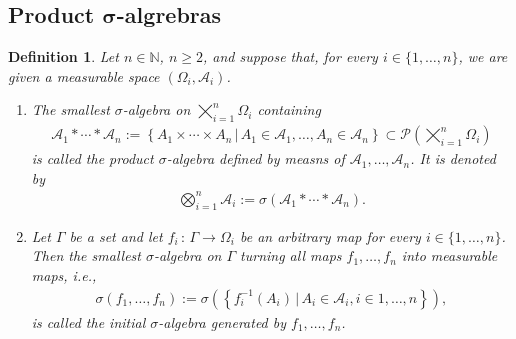 \documentclass{article}
\newtheorem{definition}{Definition}[section]
\numberwithin{equation}{section}
\begin{document}
\subsection{Product $\boldsymbol{\sigma}$-algrebras}
\begin{definition}
    Let $n\in\mathbb{N}$, $n \geq 2$, and suppose that, for every $i \in \{1,\ldots,n\}$, we are given a measurable space $(\Omega_i, \mathcal{A}_i)$.
    \begin{enumerate}
        \item The smallest $\sigma$-algebra on $\bigtimes_{i=1}^n \Omega_i$ containing
        \begin{align*}
            \mathcal{A}_1 \ast \cdots \ast \mathcal{A}_n := 
            \left\{A_1 \times \cdots \times A_n \, | \, A_1 \in \mathcal{A}_1, \ldots, A_n \in \mathcal{A}_n\right\} %
            \subset \mathcal{P}\left(\bigtimes_{i=1}^n \Omega_i\right)
        \end{align*}
        is called the product $\sigma$-algebra defined by measns of $\mathcal{A}_1,\ldots,\mathcal{A}_n$.
        It is denoted by
        \begin{align*}
            \bigotimes_{i=1}^n \mathcal{A}_i := \sigma\left(\mathcal{A}_1 \ast \cdots \ast \mathcal{A}_n\right).
        \end{align*}
        \item Let $\Gamma$ be a set and let $f_i \, : \, \Gamma \rightarrow \Omega_i$ be an arbitrary map for every $i \in \{1, \ldots, n\}$.
        Then the smallest $\sigma$-algebra on $\Gamma$ turning all maps $f_1,\ldots,f_n$ into measurable maps, i.e.,
        \begin{align*}
            \sigma(f_1, \ldots, f_n) := \sigma\left(\left\{f_i^{-1}(A_i)\, | \, A_i \in \mathcal{A}_i, i \in {1,\ldots,n}\right\}\right),
        \end{align*}
        is called the initial $\sigma$-algebra generated by $f_1, \ldots,f_n$.
    \end{enumerate}
\end{definition}
\end{document}
